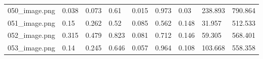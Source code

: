 \documentclass[runningheads]{llncs}
\begin{document}
\begin{table}[h!]
\begin{tabular}{|p{2.5cm}|p{1.0cm}|p{1.0cm}|p{1.0cm}|p{1.0cm}|p{1.0cm}|p{1.0cm}|p{1.0cm}|p{1.0cm}|}
050\_image.png & 0.038 & 0.073 & 0.61 & 0.015 & 0.973 & 0.03 & 238.893 & 790.864 \\
051\_image.png & 0.15 & 0.262 & 0.52 & 0.085 & 0.562 & 0.148 & 31.957 & 512.533 \\
052\_image.png & 0.315 & 0.479 & 0.823 & 0.081 & 0.712 & 0.146 & 59.305 & 568.401 \\
053\_image.png & 0.14 & 0.245 & 0.646 & 0.057 & 0.964 & 0.108 & 103.668 & 558.358 \\

\end{tabular}
\end{table}
\end{document}
